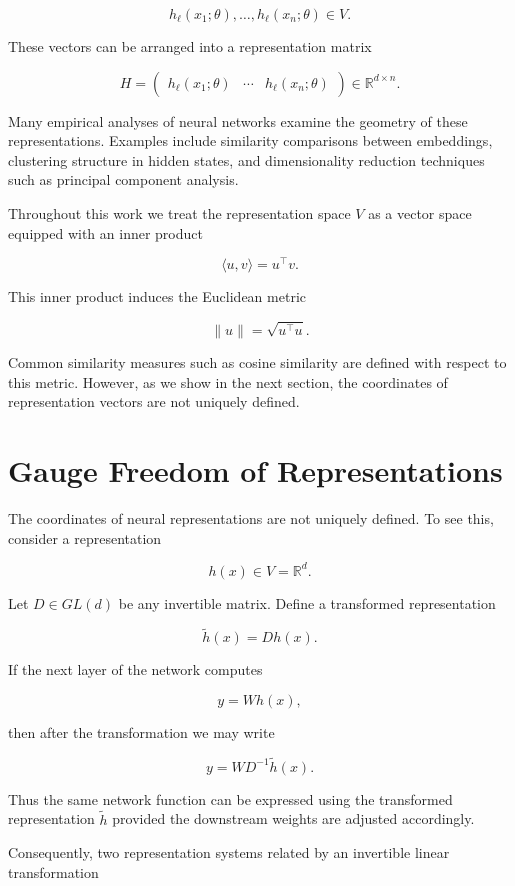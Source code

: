 \documentclass[11pt]{article}
\begin{document}
\[
h_\ell(x_1;\theta),\dots,h_\ell(x_n;\theta) \in V.
\]

These vectors can be arranged into a representation matrix

\[
H =
\begin{pmatrix}
h_\ell(x_1;\theta) & \cdots & h_\ell(x_n;\theta)
\end{pmatrix}
\in \mathbb{R}^{d \times n}.
\]

Many empirical analyses of neural networks examine the geometry of these
representations.
Examples include similarity comparisons between embeddings, clustering
structure in hidden states, and dimensionality reduction techniques such
as principal component analysis.

Throughout this work we treat the representation space $V$ as a vector
space equipped with an inner product

\[
\langle u,v\rangle = u^\top v.
\]

This inner product induces the Euclidean metric

\[
\|u\| = \sqrt{u^\top u}.
\]

Common similarity measures such as cosine similarity are defined with
respect to this metric.
However, as we show in the next section, the coordinates of representation
vectors are not uniquely defined.

\section{Gauge Freedom of Representations}

The coordinates of neural representations are not uniquely defined.
To see this, consider a representation

\[
h(x) \in V = \mathbb{R}^d.
\]

Let $D \in GL(d)$ be any invertible matrix.
Define a transformed representation

\[
\tilde h(x) = D h(x).
\]

If the next layer of the network computes

\[
y = W h(x),
\]

then after the transformation we may write

\[
y = W D^{-1} \tilde h(x).
\]

Thus the same network function can be expressed using the transformed
representation $\tilde h$ provided the downstream weights are adjusted
accordingly.

Consequently, two representation systems related by an invertible linear
transformation
\end{document}
